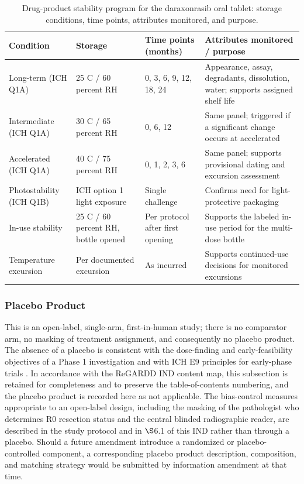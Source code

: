 \begin{table}[t]
\centering
\caption{Drug-product stability program for the daraxonrasib oral tablet:
storage conditions, time points, attributes monitored, and purpose.}
\label{tab:cmc-stability}
\begin{tabularx}{\textwidth}{L{3.5cm} L{3.3cm} L{4.2cm} Y}
\toprule
\textbf{Condition} & \textbf{Storage} & \textbf{Time points (months)} & \textbf{Attributes monitored / purpose} \\
\midrule
Long-term (ICH Q1A) & 25 C / 60 percent RH & 0, 3, 6, 9, 12, 18, 24 & Appearance, assay, degradants, dissolution, water; supports assigned shelf life \\
Intermediate (ICH Q1A) & 30 C / 65 percent RH & 0, 6, 12 & Same panel; triggered if a significant change occurs at accelerated \\
Accelerated (ICH Q1A) & 40 C / 75 percent RH & 0, 1, 2, 3, 6 & Same panel; supports provisional dating and excursion assessment \\
Photostability (ICH Q1B) & ICH option 1 light exposure & Single challenge & Confirms need for light-protective packaging \\
In-use stability & 25 C / 60 percent RH, bottle opened & Per protocol after first opening & Supports the labeled in-use period for the multi-dose bottle \\
Temperature excursion & Per documented excursion & As incurred & Supports continued-use decisions for monitored excursions \\
\bottomrule
\end{tabularx}
\end{table}

\subsubsection{Placebo Product}

This is an open-label, single-arm, first-in-human study; there is no comparator
arm, no masking of treatment assignment, and consequently no placebo product. The
absence of a placebo is consistent with the dose-finding and early-feasibility
objectives of a Phase 1 investigation and with ICH E9 principles for early-phase
trials \cite{ichpaistduni,phase1guidance}. In accordance with the ReGARDD IND
content map, this subsection is retained for completeness and to preserve the
table-of-contents numbering, and the placebo product is recorded here as not
applicable. The bias-control measures appropriate to an open-label design,
including the masking of the pathologist who determines R0 resection status and
the central blinded radiographic reader, are described in the study protocol and
in $\S$6.1 of this IND rather than through a placebo. Should a future amendment
introduce a randomized or placebo-controlled component, a corresponding placebo
product description, composition, and matching strategy would be submitted by
information amendment at that time.

